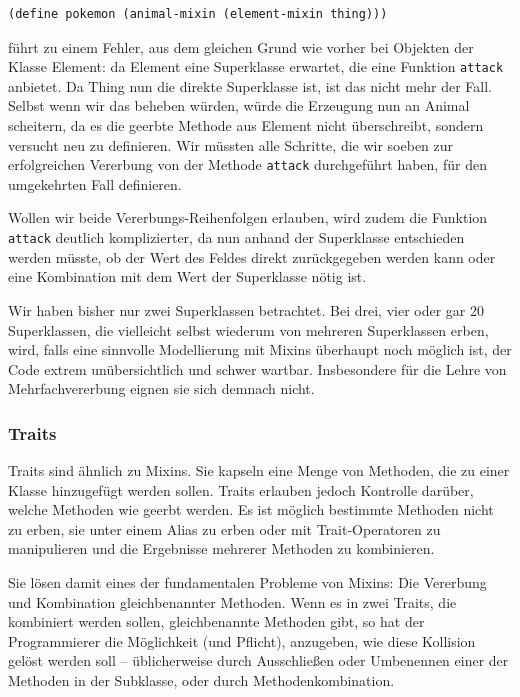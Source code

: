 \begin{lstlisting}
(define pokemon (animal-mixin (element-mixin thing)))
\end{lstlisting}

führt zu einem Fehler, aus dem gleichen Grund wie vorher bei Objekten der Klasse Element: da Element eine Superklasse erwartet, die eine Funktion \texttt{attack} anbietet. Da Thing nun die direkte Superklasse ist, ist das nicht mehr der Fall. Selbst wenn wir das beheben würden, würde die Erzeugung nun an Animal scheitern, da es die geerbte Methode aus Element nicht überschreibt, sondern versucht neu zu definieren. Wir müssten alle Schritte, die wir soeben zur erfolgreichen Vererbung von der Methode \texttt{attack} durchgeführt haben, für den umgekehrten Fall definieren. 

Wollen wir beide Vererbungs-Reihenfolgen erlauben, wird zudem die Funktion \texttt{attack} deutlich komplizierter, da nun anhand der Superklasse entschieden werden müsste, ob der Wert des Feldes direkt zurückgegeben werden kann oder eine Kombination mit dem Wert der Superklasse nötig ist.

Wir haben bisher nur zwei Superklassen betrachtet. Bei drei, vier oder gar 20 Superklassen, die vielleicht selbst wiederum von mehreren Superklassen erben, wird, falls eine sinnvolle Modellierung mit Mixins überhaupt noch möglich ist, der Code extrem unübersichtlich und schwer wartbar. Insbesondere für die Lehre von Mehrfachvererbung eignen sie sich demnach nicht.

\subsubsection{Traits}
Traits sind ähnlich zu Mixins. Sie kapseln eine Menge von Methoden, die zu einer Klasse hinzugefügt werden sollen. Traits erlauben jedoch Kontrolle darüber, welche Methoden wie geerbt werden. Es ist möglich bestimmte Methoden nicht zu erben, sie unter einem Alias zu erben oder mit Trait-Operatoren zu manipulieren und die Ergebnisse mehrerer Methoden zu kombinieren.

Sie lösen damit eines der fundamentalen Probleme von Mixins: Die Vererbung und Kombination gleichbenannter Methoden. Wenn es in zwei Traits, die kombiniert werden sollen, gleichbenannte Methoden gibt, so hat der Programmierer die Möglichkeit (und Pflicht), anzugeben, wie diese Kollision gelöst werden soll -- üblicherweise durch Ausschließen oder Umbenennen einer der Methoden in der Subklasse, oder durch Methodenkombination.

